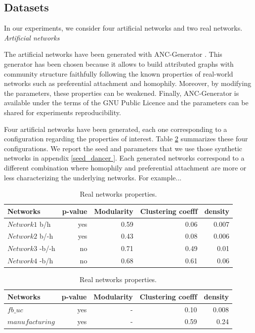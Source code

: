 \subsection{Datasets}
In our experiments, we consider four artificial networks and two real networks.\\

\textit{Artificial networks}

The artificial networks have been generated with ANC-Generator \cite{largeron2015}. This generator has been chosen because it allows to build attributed graphs with  community structure faithfully following the known properties of real-world networks such as preferential attachment and homophily.
Moreover, by modifying the parameters, these properties can be weakened. Finally, ANC-Generator is available under the terms of the GNU Public Licence and the        parameters can be shared for experiments reproducibility.

Four artificial networks have been generated, each one corresponding to a configuration  regarding the properties of interest.
Table \ref{table:artificial_networks} summarizes these four configurations. We report the seed and parameters that we use those synthetic networks in appendix \ref{seed_dancer	}. Each generated networks correspond to a different combination where homophily and preferential attachment are more or less characterizing the underlying networks. For example...

\begin{table}[h] \label{table:artificial_networks}
	\caption{Artificial networks properties.}
	\begin{tabular}{lrrrr}
		\hline
		Networks   &  p-value    &  Modularity & Clustering coefff & density   \\
		\hline
		$Network1$ b/h   & yes &0.59  & 0.06 & 0.007  \\
		$Network2$ b/-h  & yes &0.43  & 0.08 & 0.006\\
		$Network3$ -b/-h & no  &0.71  & 0.49 & 0.01 \\
		$Network4$ -b/h  & no  &0.68  & 0.61 & 0.06 \\
		\hline
	\end{tabular}
	\caption{Real networks properties.}
	\begin{tabular}{lrrrr}
		\hline
		Networks    &  p-value    &  Modularity & Clustering coefff & density   \\
		\hline
		$fb\_uc$          & yes & -  & 0.10 & 0.008 \\
		$manufacturing$   & yes & -  & 0.59 & 0.24 \\
	\end{tabular}
\end{table}

